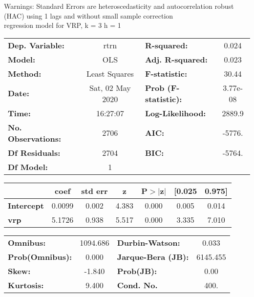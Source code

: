 Warnings: \newline
 [1] Standard Errors are heteroscedasticity and autocorrelation robust (HAC) using 1 lags and without small sample correction\\ 

regression model for VRP, k = 3 h = 1\begin{center}
\begin{tabular}{lclc}
\toprule
\textbf{Dep. Variable:}    &       rtrn       & \textbf{  R-squared:         } &     0.024   \\
\textbf{Model:}            &       OLS        & \textbf{  Adj. R-squared:    } &     0.023   \\
\textbf{Method:}           &  Least Squares   & \textbf{  F-statistic:       } &     30.44   \\
\textbf{Date:}             & Sat, 02 May 2020 & \textbf{  Prob (F-statistic):} &  3.77e-08   \\
\textbf{Time:}             &     16:27:07     & \textbf{  Log-Likelihood:    } &    2889.9   \\
\textbf{No. Observations:} &        2706      & \textbf{  AIC:               } &    -5776.   \\
\textbf{Df Residuals:}     &        2704      & \textbf{  BIC:               } &    -5764.   \\
\textbf{Df Model:}         &           1      & \textbf{                     } &             \\
\bottomrule
\end{tabular}
\begin{tabular}{lcccccc}
                   & \textbf{coef} & \textbf{std err} & \textbf{z} & \textbf{P$> |$z$|$} & \textbf{[0.025} & \textbf{0.975]}  \\
\midrule
\textbf{Intercept} &       0.0099  &        0.002     &     4.383  &         0.000        &        0.005    &        0.014     \\
\textbf{vrp}       &       5.1726  &        0.938     &     5.517  &         0.000        &        3.335    &        7.010     \\
\bottomrule
\end{tabular}
\begin{tabular}{lclc}
\textbf{Omnibus:}       & 1094.686 & \textbf{  Durbin-Watson:     } &    0.033  \\
\textbf{Prob(Omnibus):} &   0.000  & \textbf{  Jarque-Bera (JB):  } & 6145.455  \\
\textbf{Skew:}          &  -1.840  & \textbf{  Prob(JB):          } &     0.00  \\
\textbf{Kurtosis:}      &   9.400  & \textbf{  Cond. No.          } &     400.  \\
\bottomrule
\end{tabular}
\end{center}

